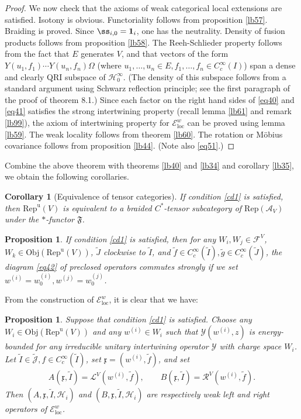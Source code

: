\documentclass[12pt,a4paper]{article}
\theoremstyle{definition}
\theoremstyle{plain}
\newtheorem{pp}[df]{Proposition}
\newtheorem{co}[df]{Corollary}
\newcommand{\fk}{\mathfrak}
\newcommand{\mc}{\mathcal}
\newcommand{\wtd}{\widetilde}
\newcommand{\id}{\mathbf{1}}
\newcommand{\Rep}{\mathrm{Rep}}
\newcommand{\loc}{\mathrm{loc}}
\newcommand{\scr}{\mathscr}
\newcommand{\Jtd}{\widetilde{\mathcal J}}
\newcommand{\RepuV}{\mathrm{Rep}^{\mathrm u}(V)}
\newcommand{\Obj}{\mathrm{Obj}}
\numberwithin{equation}{subsection}
\begin{document}
\begin{proof}
We now check that the axioms of  weak categorical local extensions are satisfied. Isotony is obvious. Functoriality follows from proposition \ref{lb57}. Braiding is proved. Since $\ss_{i,0}=\id_i$, one has the neutrality. Density of fusion products follows from proposition \ref{lb58}. The Reeh-Schlieder property follows from the fact that $E$ generates $V$, and that vectors of the form $Y(u_1,f_1)\cdots Y(u_n,f_n)\Omega$ (where $u_1,\dots,u_n\in E,f_1,\dots,f_n\in C_c^\infty(I)$) span a dense and clearly QRI subspace of $\mc H_0^\infty$. (The density of this subspace follows from a standard argument using Schwarz reflection principle; see the first paragraph of the proof of \cite{CKLW18} theorem 8.1.) Since each factor on the right hand sides of \eqref{eq40} and \eqref{eq41} satisfies the strong intertwining property (recall lemma \ref{lb61} and remark \ref{lb99}), the axiom of intertwining property for $\scr E^w_\loc$ can be proved using lemma \ref{lb59}. The weak locality follows from theorem \ref{lb60}. The rotation or M\"obius covariance follows from proposition \ref{lb44}.
(Note also \eqref{eq51}.)  %
\end{proof}


Combine the above theorem with theorems \ref{lb40} and \ref{lb34} and corollary \ref{lb35}, we obtain the following corollaries.

\begin{co}[Equivalence of tensor categories]\label{lb71}
If condition \ref{cd1} is satisfied, then $\RepuV$ is equivalent to a braided $C^*$-tensor subcategory of $\Rep(\mc A_V)$ under the $*$-functor $\fk F$.
\end{co}

\begin{pp}\label{lb78}
If condition \ref{cd1} is satisfied, then for any $W_i,W_j\in\mc F^V$, $W_k\in\Obj(\RepuV)$, $\wtd J$ clockwise to $\wtd I$, and $\wtd f\in C_c^\infty(\wtd I),\wtd g\in C_c^\infty(\wtd J)$, the diagram \eqref{eq42} of preclosed operators commutes strongly if we set $w^{(i)}=w^{(i)}_0,w^{(j)}=w^{(j)}_0$.
\end{pp}

From the construction of $\scr E^w_\loc$, it is clear that we have:

\begin{pp}\label{lb64}
Suppose that condition \ref{cd1} is satisfied. Choose any $W_i\in\Obj(\RepuV)$ and any $w^{(i)}\in W_i$ such that $\mc Y(w^{(i)},z)$ is energy-bounded for any irreducible unitary intertwining operator $\mc Y$ with charge space $W_i$. Let $\wtd I\in\Jtd,f\in C_c^\infty(\wtd I)$,  set $\fk x=(w^{(i)},\wtd f)$, and set
\begin{align}
A(\fk x,\wtd I)=\mc L^V(w^{(i)},\wtd f),\qquad B(\fk x,\wtd I)=\mc R^V(w^{(i)},\wtd f).
\end{align}
Then $(A,\fk x,\wtd I,\mc H_i)$ and $(B,\fk x,\wtd I,\mc H_i)$ are respectively weak left and right operators of $\scr E^w_\loc$.
\end{pp}
\end{document}

